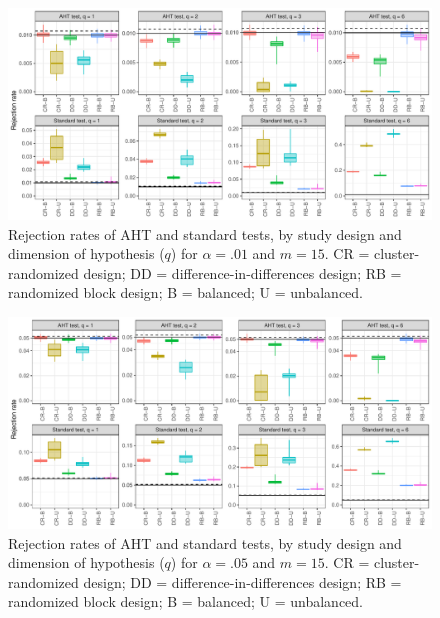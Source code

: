 \documentclass[12pt]{article}
\begin{document}
\begin{landscape}
\begin{figure}[H]

{\centering \includegraphics[width=\linewidth]{CR_fig/balance_01_15-1} 

}

\caption{Rejection rates of AHT and standard tests, by study design and dimension of hypothesis ($q$) for $\alpha = .01$ and $m = 15$. CR = cluster-randomized design; DD = difference-in-differences design; RB = randomized block design; B = balanced; U = unbalanced.}\label{fig:balance_01_15}
\end{figure}

\begin{figure}[H]

{\centering \includegraphics[width=\linewidth]{CR_fig/balance_05_15-1} 

}

\caption{Rejection rates of AHT and standard tests, by study design and dimension of hypothesis ($q$) for $\alpha = .05$ and $m = 15$. CR = cluster-randomized design; DD = difference-in-differences design; RB = randomized block design; B = balanced; U = unbalanced.}\label{fig:balance_05_15}
\end{figure}

\begin{figure}[H]


\end{figure}
\end{landscape}
\end{document}
